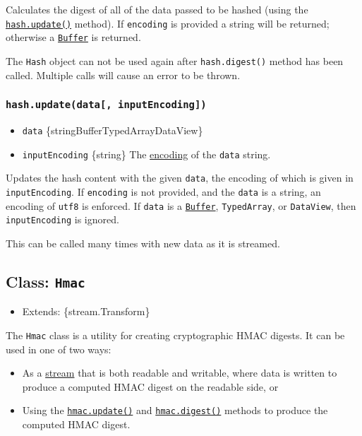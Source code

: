 Calculates the digest of all of the data passed to be hashed (using the
\hyperref[hashupdatedata-inputencoding]{\texttt{hash.update()}} method).
If \texttt{encoding} is provided a string will be returned; otherwise a
\href{buffer.md}{\texttt{Buffer}} is returned.

The \texttt{Hash} object can not be used again after
\texttt{hash.digest()} method has been called. Multiple calls will cause
an error to be thrown.

\subsubsection{\texorpdfstring{\texttt{hash.update(data{[},\ inputEncoding{]})}}{hash.update(data{[}, inputEncoding{]})}}\label{hash.updatedata-inputencoding}

\begin{itemize}
\tightlist
\item
  \texttt{data}
  \{string\textbar Buffer\textbar TypedArray\textbar DataView\}
\item
  \texttt{inputEncoding} \{string\} The
  \href{buffer.md\#buffers-and-character-encodings}{encoding} of the
  \texttt{data} string.
\end{itemize}

Updates the hash content with the given \texttt{data}, the encoding of
which is given in \texttt{inputEncoding}. If \texttt{encoding} is not
provided, and the \texttt{data} is a string, an encoding of
\texttt{\textquotesingle{}utf8\textquotesingle{}} is enforced. If
\texttt{data} is a \href{buffer.md}{\texttt{Buffer}},
\texttt{TypedArray}, or \texttt{DataView}, then \texttt{inputEncoding}
is ignored.

This can be called many times with new data as it is streamed.

\subsection{\texorpdfstring{Class:
\texttt{Hmac}}{Class: Hmac}}\label{class-hmac}

\begin{itemize}
\tightlist
\item
  Extends: \{stream.Transform\}
\end{itemize}

The \texttt{Hmac} class is a utility for creating cryptographic HMAC
digests. It can be used in one of two ways:

\begin{itemize}
\tightlist
\item
  As a \href{stream.md}{stream} that is both readable and writable,
  where data is written to produce a computed HMAC digest on the
  readable side, or
\item
  Using the
  \hyperref[hmacupdatedata-inputencoding]{\texttt{hmac.update()}} and
  \hyperref[hmacdigestencoding]{\texttt{hmac.digest()}} methods to
  produce the computed HMAC digest.
\end{itemize}

